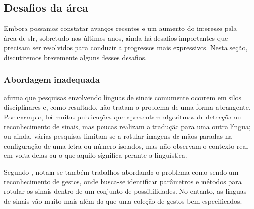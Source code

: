 \subsection{Desafios da área}
\label{sec:slr-desafios}

Embora possamos constatar avanços recentes e um aumento do interesse pela área de \acrshort{slr}, sobretudo nos últimos anos, ainda há desafios importantes que precisam ser resolvidos para conduzir a progressos mais expressivos. 
Nesta seção, discutiremos brevemente alguns desses desafios.



\subsubsection{Abordagem inadequada}
\label{sec:slr-desafios-abordagem-inadequada}

 afirma que pesquisas envolvendo línguas de sinais comumente ocorrem em silos disciplinares e, como resultado, não tratam o problema de uma forma abrangente.
Por exemplo, há muitas publicações que apresentam algoritmos de detecção ou reconhecimento de sinais, mas poucas realizam a tradução para uma outra língua; ou ainda, várias pesquisas limitam-se a rotular imagens de mãos paradas na configuração de uma letra ou número isolados, mas não observam o contexto real em volta delas ou o que aquilo significa perante a linguística. 

Segundo , notam-se também trabalhos abordando o problema como sendo um reconhecimento de gestos, onde busca-se identificar parâmetros e métodos para rotular os sinais dentro de um conjunto de possibilidades. No entanto, as línguas de sinais vão muito mais além do que uma coleção de gestos bem especificados.

